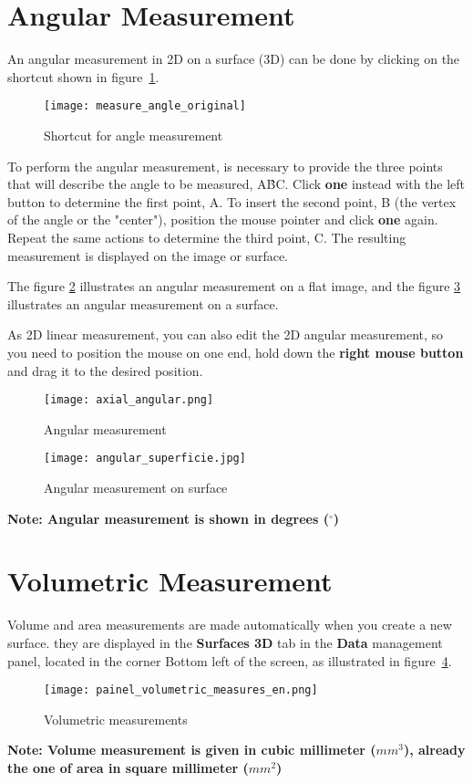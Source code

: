 \section{Angular Measurement}

An angular measurement in 2D on a surface (3D) can be done by clicking on the shortcut shown in figure~\ref{fig:atalho_angular}.

\begin{figure}[!htb]
\centering
\texttt{[image: measure\_angle\_original]}
\caption{Shortcut for angle measurement}
\label{fig:atalho_angular}
\end{figure}

To perform the angular measurement, is necessary to provide the three points that will describe the angle to be measured, A\^{B}C. Click \textbf{one} instead with the left button to determine the first point, A. To insert the second point, B (the vertex of the angle or the "center"), position the mouse pointer and click \textbf{one} again. Repeat the same actions to determine the third point, C. The resulting measurement is displayed on the image or surface.

The figure \ref{fig:axial_angular} illustrates an angular measurement on a flat image, and the figure \ref{fig:axial_superficie} illustrates an angular measurement on a surface.

As 2D linear measurement, you can also edit the 2D angular measurement, so you need to position the mouse on one end, hold down the \textbf{right mouse button} and drag it to the desired position.

\begin{figure}[!htb]
\centering
\texttt{[image: axial\_angular.png]}
\caption{Angular measurement}
\label{fig:axial_angular}
\end{figure}

\begin{figure}[!htb]
\centering
\texttt{[image: angular\_superficie.jpg]}
\caption{Angular measurement on surface}
\label{fig:axial_superficie}
\end{figure}

\textbf{Note: Angular measurement is shown in degrees ($^{\circ}$)}


\section{Volumetric Measurement}

Volume and area measurements are made automatically when you create a new surface. they are displayed in the \textbf{Surfaces 3D} tab in the \textbf{Data} management panel, located in the corner
Bottom left of the screen, as illustrated in figure~\ref{fig:volumetric_mensure}.

\begin{figure}[!htb]
\centering
\texttt{[image: painel\_volumetric\_measures\_en.png]}
\caption{Volumetric measurements}
\label{fig:volumetric_mensure}
\end{figure}

\textbf{Note: Volume measurement is given in cubic millimeter ($mm^3$), already the one of area in square millimeter ($mm^2$)}